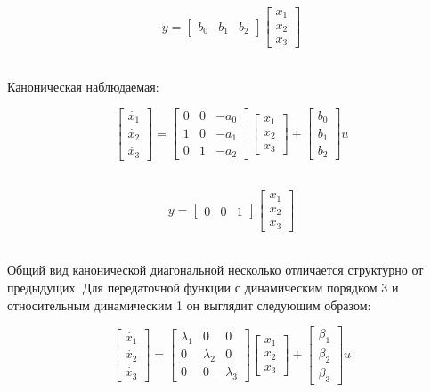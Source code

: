 \documentclass[a4paper]{article}
\begin{document}
$$
y = \begin{bmatrix}
    b_0 & b_1 & b_2
\end{bmatrix}\begin{bmatrix}
    x_1 \\
    x_2 \\
    x_3
\end{bmatrix}
$$\

Каноническая наблюдаемая:

$$
\begin{bmatrix}
    \dot{x_1} \\
    \dot{x_2} \\
    \dot{x_3}
\end{bmatrix} = \begin{bmatrix}
    0 & 0 & -a_0 \\ 
    1 & 0 & -a_1 \\
    0 & 1 & -a_2
\end{bmatrix}\begin{bmatrix}
    x_1 \\
    x_2 \\
    x_3
\end{bmatrix} + \begin{bmatrix}
    b_0 \\ 
    b_1 \\ 
    b_2
\end{bmatrix}u
$$\

$$
y = \begin{bmatrix}
    0 & 0 & 1
\end{bmatrix}\begin{bmatrix}
    x_1 \\
    x_2 \\
    x_3
\end{bmatrix}
$$\

Общий вид канонической диагональной несколько отличается структурно от предыдущих. Для передаточной функции с динамическим порядком 3 и относительным динамическим 1 он выглядит следующим образом:

$$
\begin{bmatrix}
    \dot{x_1} \\
    \dot{x_2} \\
    \dot{x_3}
\end{bmatrix} = \begin{bmatrix}
    \lambda_1 & 0 & 0 \\ 
    0 & \lambda_2 & 0 \\
    0 & 0 & \lambda_3
\end{bmatrix}\begin{bmatrix}
    x_1 \\
    x_2 \\
    x_3
\end{bmatrix} + \begin{bmatrix}
    \beta_1 \\ 
    \beta_2 \\ 
    \beta_3
\end{bmatrix}u
$$\
\end{document}
